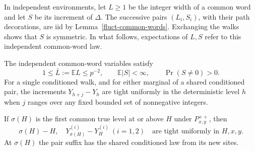 In independent environments, let \(L\ge1\) be the integer width of a
common word and let \(S\) be its increment of \(\Delta\). The successive
pairs \((L_i,S_i)\), with their path decorations, are iid by
Lemma~\ref{fluct-common-words}. Exchanging the walks shows that \(S\) is
symmetric. In what follows, expectations of \(L,S\) refer to this
independent common-word law.

\begin{lemma}
\label{fluct-local-tightness}
The independent common-word variables satisfy
\[
1\le \bar L:=\mathbb E L\le p^{-2},\qquad
\mathbb E|S|<\infty,\qquad \Pr(S\ne0)>0.
\]
For a single conditioned walk, and for either marginal of a shared
conditioned pair, the increments \(Y_{h+j}-Y_h\) are tight uniformly in
the deterministic level \(h\) when \(j\) ranges over any fixed bounded
set of nonnegative integers.

If \(\sigma(H)\) is the first common true level at or above \(H\) under
\(P_{x,y}^{++}\), then
\[
\sigma(H)-H,\quad
Y^{(i)}_{\sigma(H)}-Y^{(i)}_H\ (i=1,2)
\quad\text{are tight uniformly in }H,x,y.
\tag{6}\label{eq:6}
\]
At \(\sigma(H)\) the pair suffix has the shared conditioned law from its
new sites.
\end{lemma}

